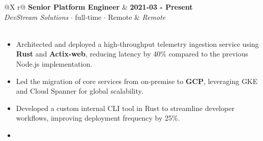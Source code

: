 \documentclass[11pt,letterpaper]{article}
\begin{document}
    
        \begin{infocard}
        \begin{tabularx}{\linewidth}{@{}X r@{}}
        \textbf{\large\color{headercolor} Senior Platform Engineer } & \textbf{\color{accentcolor} 2021-03 - Present } \\
        \vspace{4pt}
        \textit{\color{headercolor} DevStream Solutions } \color{accentcolor}  $\cdot$ full-time $\cdot$ Remote & \textit{\color{accentcolor} Remote } \\
        
        
             \\
        
        \end{tabularx}

        \vspace{2pt}
        \color{textcolor}
        
            \begin{itemize}[itemsep=2pt, parsep=1pt, leftmargin=1em]
            
                \item
                
                    Architected and deployed a high-throughput telemetry ingestion service using \textbf{Rust} and \textbf{Actix-web}, reducing latency by 40\% compared to the previous Node.js implementation.
                
                
                
            
                \item
                
                    Led the migration of core services from on-premise to \textbf{GCP}, leveraging GKE and Cloud Spanner for global scalability.
                
                
                
            
                \item
                
                    Developed a custom internal CLI tool in Rust to streamline developer workflows, improving deployment frequency by 25\%.
                
                
                
            
                \item
                

\end{itemize}
\end{infocard}
\end{document}
